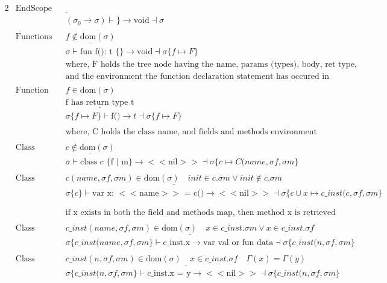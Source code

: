 \documentclass{article}
\begin{document}
\begin{alignat*}{2}
    &\text{EndScope} && \underline{} \\ 
    & && (\sigma_0 \rightarrow \sigma) \vdash \text{\}} \rightarrow \text{void} \dashv \sigma \\\\[10pt]
    &\text{Functions} && \underline{f \notin \text{dom}(\sigma)} \\ 
    & && \sigma \vdash \text{fun f(): t \{\}}\rightarrow \text{void} \dashv \sigma \{f \mapsto F\} \\ 
    & && \text{where, F holds the tree node having the name, params (types), body, ret type,} \\ 
    & && \text{and the environment the function declaration statement has occured in}\\\\[10pt]
    &\text{Function Call} && f \in \text{dom}(\sigma) \\ 
& && \underline{\text{f has return type t}} \\ 
& && \sigma \{f \mapsto F\} \vdash \text{f()} \rightarrow t \dashv \sigma \{f \mapsto F\} \\\\[10pt]  
    & && \text{where, C holds the class name, and fields and methods environment}\\\\[10pt]
    &\text{Class Decl.} && \underline{c \notin \text{dom}(\sigma)} \\ 
    & && \sigma \vdash \text{class c \{ f | m\}} \rightarrow \text{$<<$nil$>>$} \dashv \sigma \{c \mapsto C(name, \sigma f, \sigma m\} 
    \\\\[10pt]
    &\text{Class Inst. Creation} && \underline{c(name, \sigma f, \sigma m) \in \text{dom}(\sigma) \quad init \in c.\sigma m \vee init \notin c.\sigma m} \\ 
    & && \sigma \{c\} \vdash \text{var x: $<<$name$>>$ = c()} \rightarrow \text{$<<$nil$>>$} \dashv \sigma \{c \cup x \mapsto c\_inst(c, \sigma f, \sigma m\} 
    \\\\[10pt]
    & \\ 
    & && \text{if x exists in both the field and methods map, then method x is retrieved}\\\\[10pt]
    &\text{Class Field Retrieval} && \underline{c\_ inst(name, \sigma f, \sigma m) \in \text{dom}(\sigma) \quad x \in c\_inst .\sigma m \vee x \in c\_inst .\sigma f} \\ 
    & && \sigma \{c\_ inst (name, \sigma f, \sigma m\} \vdash \text{c\_ inst.x} \rightarrow \text{var val or fun data} \dashv \sigma \{c\_ inst (n, \sigma f, \sigma m\} 
    \\\\[10pt]
    &\text{Class Field Set} && \underline{c\_ inst(n, \sigma f, \sigma m) \in \text{dom}(\sigma) \quad x \in c\_inst .\sigma f \quad \Gamma (x) = \Gamma (y)} \\ 
    & && \sigma \{c\_ inst (n, \sigma f, \sigma m\} \vdash \text{c\_inst.x = y} \rightarrow \text{$<<$nil$>>$} \dashv \sigma \{c\_ inst (n, \sigma f, \sigma m\}  
\end{alignat*}
\end{document}
